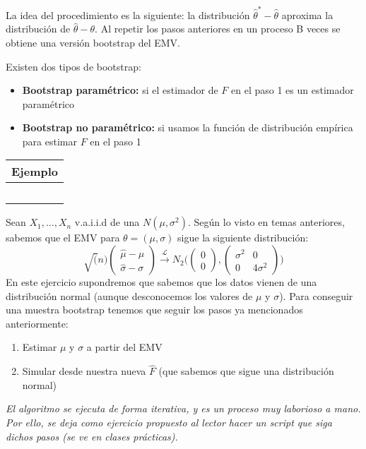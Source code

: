 La idea del procedimiento es la siguiente: la distribución $\hat\theta^*-\hat\theta$ aproxima la distribución de $\hat\theta-\theta$. Al repetir los pasos anteriores en un proceso B veces se obtiene una versión bootstrap del EMV.

Existen dos tipos de bootstrap:
\begin{itemize}
    \item \textbf{Bootstrap paramétrico:} si el estimador de $F$ en el paso 1 es un estimador paramétrico
    \item \textbf{Bootstrap no paramétrico:} si usamos la función de distribución empírica para estimar $F$ en el paso 1
\end{itemize}

\hspace{-1cm}\noindent\begin{tabular}{r}
    \textbf{Ejemplo}  \\ \hline \ \\
\end{tabular}

Sean $X_1,\dots,X_n$ v.a.i.i.d de una $N(\mu,\sigma^2)$. Según lo visto en temas anteriores, sabemos que el EMV para $\theta=(\mu,\sigma)$ sigue la siguiente distribución:
$$\sqrt(n)\begin{pmatrix}
    \hat\mu-\mu\\
    \hat\sigma-\sigma
\end{pmatrix} \overset{\mathcal{L}}{\longrightarrow}N_2\Bigg(\begin{pmatrix}
    0 \\ 0 \end{pmatrix},\begin{pmatrix}
        \sigma^2 & 0 \\ 0 & 4\sigma^2
    \end{pmatrix}\Bigg)$$
    En este ejercicio supondremos que sabemos que los datos vienen de una distribución normal (aunque desconocemos los valores de $\mu$ y $\sigma$). Para conseguir una muestra bootstrap tenemos que seguir los pasos ya mencionados anteriormente:
\begin{enumerate}
    \item Estimar $\mu$ y $\sigma$ a partir del EMV
    \item Simular desde nuestra nueva $\hat F$ (que sabemos que sigue una distribución normal)
\end{enumerate}
\textit{El algoritmo se ejecuta de forma iterativa, y es un proceso muy laborioso a mano. Por ello, se deja como ejercicio propuesto al lector hacer un script que siga dichos pasos (se ve en clases prácticas).}\\

